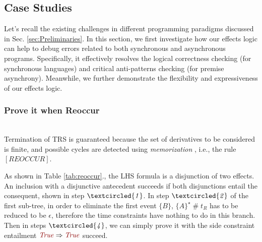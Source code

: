 \documentclass[acmsmall,10pt,review]{acmart}
\newcommand{\effect}{\textcolor{black}{\ensuremath{\mathrm{\Phi}}}}
\newcommand{\code}[1]{{\tt{\ensuremath{\m{#1}}}}}
\newcommand{\CONTAIN}{\sqsubseteq}
\newcommand{\m}{\mathit}
\newcommand{\mysharp}{{\mathrel{\texttt{\#}}}}
\newcommand\tabref[1]{Table \textcolor{black}{\ref{#1}}.}
\newcommand\secref[1]{Sec. \textcolor{black}{\ref{#1}}}
\begin{document}
{\subsection{Case Studies}
\label{subsec:Case_Studies}

Let's recall the existing challenges in different programming paradigms discussed in \secref{sec:Preliminaries}. In this section, we first investigate how our effects logic can help to debug errors related to both synchronous and asynchronous programs. Specifically, it effectively resolves the logical correctness checking (for synchronous languages) and critical anti-patterns checking (for premise asynchrony). 
Meanwhile, we further demonstrate the flexibility and expressiveness of our effects logic. 










\subsubsection{Prove it when Reoccur}~\\

Termination of TRS is guaranteed because the set of derivatives to be considered is finite, and possible cycles are detected using \emph{memorization} \cite{brotherston2005cyclic}, i.e., the rule \code{[REOCCUR]}. %






As shown in \tabref{tab:reoccur}, the LHS formula is a disjunction of two effects. An inclusion with a disjunctive antecedent succeeds if both disjunctions entail the consequent, shown in step \code{\textcircled{1}}.  
In step \code{\textcircled{2}} of the first sub-tree, in order to eliminate the first event \code{\{B\}}, \code{\{A\}^\star \mysharp  t_R} has to be reduced to be \code{\epsilon}, therefore the time constraints have nothing to do in this branch. 
Then in steps \code{\code{\textcircled{4}}}, we
can simply prove it with the side constraint entailment \code{\textcolor {darkred}{True} \Rightarrow  \textcolor {darkred}{True}} succeed.


}
\end{document}

